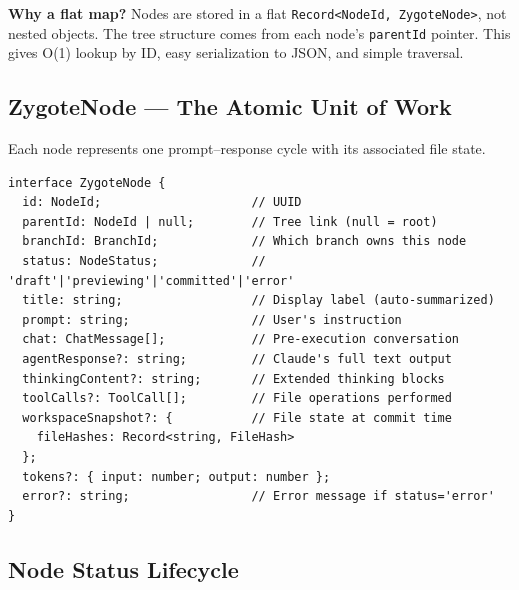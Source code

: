 \documentclass[12pt, a4paper]{article}
\begin{document}
\begin{keypoint}
\textbf{Why a flat map?} Nodes are stored in a flat \texttt{Record<NodeId, ZygoteNode>}, not nested objects. The tree structure comes from each node's \texttt{parentId} pointer. This gives O(1) lookup by ID, easy serialization to JSON, and simple traversal.
\end{keypoint}

\subsection{ZygoteNode --- The Atomic Unit of Work}

Each node represents one prompt--response cycle with its associated file state.

\begin{lstlisting}
interface ZygoteNode {
  id: NodeId;                     // UUID
  parentId: NodeId | null;        // Tree link (null = root)
  branchId: BranchId;             // Which branch owns this node
  status: NodeStatus;             // 'draft'|'previewing'|'committed'|'error'
  title: string;                  // Display label (auto-summarized)
  prompt: string;                 // User's instruction
  chat: ChatMessage[];            // Pre-execution conversation
  agentResponse?: string;         // Claude's full text output
  thinkingContent?: string;       // Extended thinking blocks
  toolCalls?: ToolCall[];         // File operations performed
  workspaceSnapshot?: {           // File state at commit time
    fileHashes: Record<string, FileHash>
  };
  tokens?: { input: number; output: number };
  error?: string;                 // Error message if status='error'
}
\end{lstlisting}

\subsection{Node Status Lifecycle}
\end{document}
